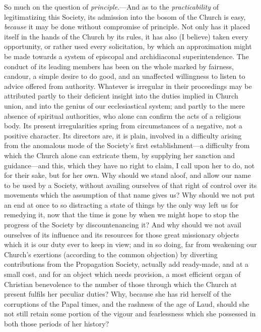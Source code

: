 So much on the question of \emph{principle}.—And
as to the \emph{practicability} of legitimatizing this Society, its
admission into the bosom of the Church is easy, \emph{because} it may
be done without compromise of principle. Not only has it placed itself
in the hands of the Church by its rules, it has also (I believe) taken
every opportunity, or rather used every solicitation, by which an
approximation might be made towards a system of episcopal and
archidiaconal superintendence. The conduct of its leading members has
been on the whole marked by fairness, candour, a simple desire to do
good, and an unaffected willingness to listen to advice offered from
authority. Whatever is irregular in their proceedings may be
attributed partly to their deficient insight into the duties implied
in Church union, and into the genius of our ecclesiastical system; and
partly to the mere absence of spiritual authorities, who alone can
confirm the acts of a religious body. Its present irregularities
spring from circumstances of a negative, not a positive character. Its
directors are, it is plain, involved in a difficulty arising from the
anomalous mode of the Society's first establishment—a difficulty
from which the Church alone can extricate them, by supplying her
sanction and guidance—and this, which they have no right to claim, I
call upon her to do, not for their sake, but for her own. Why should
we stand aloof, and allow our name to be used by a Society, without
availing ourselves of that right of control over its movements which
the assumption of that name gives us? Why should we not put an end at
once to so distracting a state of things by the only way left us for
remedying it, now that the time is gone by when we might hope to stop
the progress of the Society by discountenancing it? And why should we
not avail ourselves of its influence and its resources for those great
missionary objects which it is our duty ever to keep in view; and in
so doing, far from weakening our Church's exertions (according to the
common objection) by diverting contributions from the Propagation
Society, actually add ready-made, and at a small cost, and for an
object which needs provision, a most efficient organ of Christian
benevolence to the number of those through which the Church at present
fulfils her peculiar duties? Why, because she has rid herself of the
corruptions of the Papal times, and the rashness of the age of
Laud, should she not still retain some portion of the vigour and
fearlessness which she possessed in both those periods of her history?

